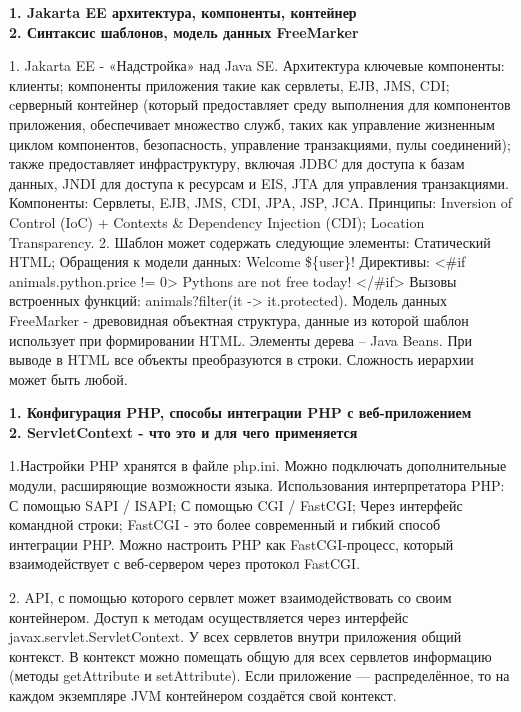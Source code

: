 \documentclass{article}
\begin{document}
\hfill
\begin{minipage}{.3\textwidth}
    \textbf{1. Jakarta EE архитектура, компоненты, контейнер}\\
    \textbf{2. Синтаксис шаблонов, модель данных FreeMarker}

1. Jakarta EE - «Надстройка» над Java SE. Архитектура ключевые компоненты: клиенты; компоненты приложения такие как сервлеты, EJB, JMS, CDI;
cерверный контейнер (который предоставляет среду выполнения для компонентов приложения, обеспечивает множество служб, таких как управление жизненным циклом компонентов, безопасность, управление транзакциями, пулы соединений); 
также предоставляет инфраструктуру, включая JDBC для доступа к базам данных, JNDI для доступа к ресурсам и EIS, JTA для управления транзакциями. Компоненты: Сервлеты, EJB, JMS, CDI, JPA, JSP, JCA. Принципы:
Inversion of Control (IoC) + Contexts \& Dependency Injection (CDI); Location Transparency.
2. Шаблон может содержать следующие элементы: Статический HTML; Обращения к модели данных: Welcome \$\{user\}! Директивы:
     <\#if animals.python.price != 0>
         Pythons are not free today!
</\#if>
Вызовы встроенных функций:
animals?filter(it -> it.protected). Модель данных FreeMarker - древовидная объектная структура, данные из которой шаблон использует при формировании HTML. Элементы дерева – Java Beans. При выводе в HTML все объекты преобразуются в строки. Сложность иерархии может быть любой.
\end{minipage}
\hfill
\begin{minipage}{.3\textwidth}
    \textbf{1. Конфигурация PHP, способы интеграции PHP с веб-приложением}\\
    \textbf{2. ServletContext - что это и для чего применяется}

1.Настройки PHP хранятся в файле php.ini. Можно подключать дополнительные модули, расширяющие возможности языка. Использования интерпретатора PHP:
С помощью SAPI / ISAPI; С помощью CGI / FastCGI; Через интерфейс командной строки; 
FastCGI - это более современный и гибкий способ интеграции PHP. Можно настроить PHP как FastCGI-процесс, который взаимодействует с веб-сервером через протокол FastCGI.

2. API, с помощью которого сервлет может взаимодействовать со своим контейнером. Доступ к методам осуществляется через интерфейс javax.servlet.ServletContext. 
У всех сервлетов внутри приложения общий контекст. В контекст можно помещать общую для всех сервлетов информацию (методы getAttribute и setAttribute).
Если приложение — распределённое, то на каждом экземпляре JVM контейнером создаётся свой контекст.
\end{minipage}
\end{document}

